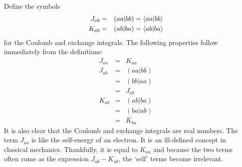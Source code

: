 Define the symbols
\begin{eqnarray}
J_{ab} &=& (aa|bb) = \braket{aa|bb} \label{c2e116} \\
K_{ab} &=& (ab|ba) = \braket{ab|ba} \label{c2e117}
\end{eqnarray}
for the Coulomb and exchange integrals. The following properties follow 
immediately from the definitions:
\begin{eqnarray}
J_{aa} &=& K_{aa} \label{c2e118} \\
J_{ab} &=& (aa|bb) \nonumber \\
       &=& (bb|aa) \nonumber \\
       &=& J_{ab} \label{c2e119} \\
K_{ab} &=& (ab|ba) \nonumber \\
       &=& (ba|ab) \nonumber \\
       &=& K_{ba} \label{c2e120}
\end{eqnarray}
It is also clear that the Coulomb and exchange integrals are real numbers. The
term $J_{aa}$ is like the self-energy of an electron. It is an ill-defined 
concept in classical mechanics. Thankfully, it is equal to $K_{aa}$ and because
the two terms often come as the expression $J_{ab} - K_{ab}$, the `self' terms
become irrelevant.

